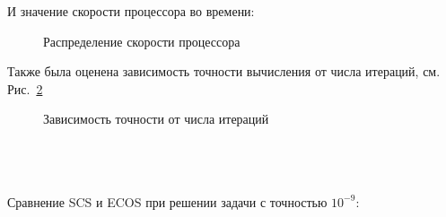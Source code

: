 \documentclass{article}
\begin{document}
И значение скорости процессора во времени:\\

\begin{figure}[h]
\caption{Распределение скорости процессора}
\label{ris:speed}
\end{figure}


Также была оценена зависимость точности вычисления от числа итераций, см. Рис.~\ref{ris:PREC_iter}

\begin{figure}[h]
\caption{Зависимость точности от числа итераций}
\label{ris:PREC_iter}
\end{figure}
\\
$~$
\\
$~$
\\
Сравнение SCS и ECOS при решении задачи с точностью $10^{-9}$:
\end{document}
